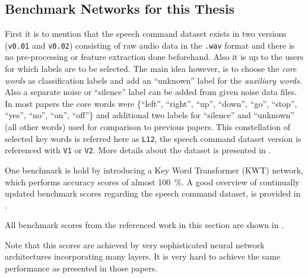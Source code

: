 \subsection{Benchmark Networks for this Thesis}\label{sec:prev_kws_benchmark}
First it is to mention that the speech command dataset \cite{Warden2018} exists in two versions (\texttt{v0.01} and \texttt{v0.02}) consisting of raw audio data in the \texttt{.wav} format and there is no pre-processing or feature extraction done beforehand.
Also it is up to the users for which labels are to be selected.
The main idea however, is to choose the \emph{core words} as classification labels and add an \enquote{unknown} label for the \emph{auxiliary words}.
Also a separate noise or \enquote{silence} label can be added from given noise data files.
In most papers the core words were \{\enquote{left},  \enquote{right}, \enquote{up}, \enquote{down}, \enquote{go}, \enquote{stop}, \enquote{yes}, \enquote{no}, \enquote{on}, \enquote{off}\} and additional two labels for \enquote{silence} and \enquote{unknown} (all other words) used for comparison to previous papers.
This constellation of selected key words is referred here as \texttt{L12}, the speech command dataset version is referenced with \texttt{V1} or \texttt{V2}.
More details about the dataset is presented in .

One benchmark is hold by \cite{Berg2021} introducing a Key Word Transformer (KWT) network, which performs accuracy scores of almost \SI{100}{\percent}.
A good overview of continually updated benchmark scores regarding the speech command dataset, is provided in \cite{PaperswithcodeKWS}.

All benchmark scores from the referenced work in this section are shown in .

Note that this scores are achieved by very sophisticated neural network architectures incorporating many layers.
It is very hard to achieve the same performance as presented in those papers.